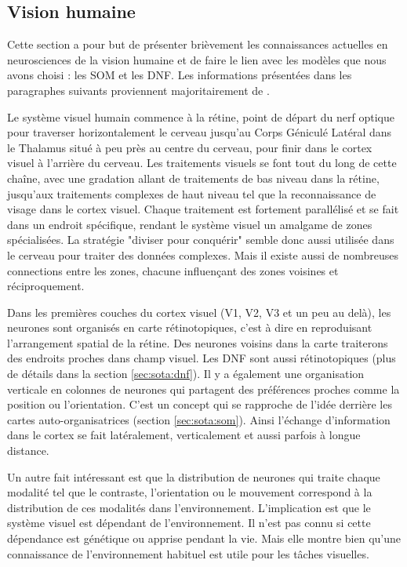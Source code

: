 \subsection{Vision humaine}\label{sec:sota:human_vis}

	Cette section a pour but de présenter brièvement les connaissances actuelles en neurosciences de la vision humaine et de faire le lien avec les modèles que nous avons choisi : les SOM et les DNF. Les informations présentées dans les paragraphes suivants proviennent majoritairement de \cite{gilbert2020constructive}.

	Le système visuel humain commence à la rétine, point de départ du nerf optique pour traverser horizontalement le cerveau jusqu'au Corps Géniculé Latéral dans le Thalamus situé à peu près au centre du cerveau, pour finir dans le cortex visuel à l'arrière du cerveau. Les traitements visuels se font tout du long de cette chaîne, avec une gradation allant de traitements de bas niveau dans la rétine, jusqu'aux traitements complexes de haut niveau tel que la reconnaissance de visage dans le cortex visuel. Chaque traitement est fortement parallélisé et se fait dans un endroit spécifique, rendant le système visuel un amalgame de zones spécialisées. La stratégie "diviser pour conquérir" semble donc aussi utilisée dans le cerveau pour traiter des données complexes. Mais il existe aussi de nombreuses connections entre les zones, chacune influençant des zones voisines et réciproquement.

	Dans les premières couches du cortex visuel (V1, V2, V3 et un peu au delà), les neurones sont organisés en carte rétinotopiques, c'est à dire en reproduisant l'arrangement spatial de la rétine. Des neurones voisins dans la carte traiterons des endroits proches dans champ visuel. Les DNF sont aussi rétinotopiques (plus de détails dans la section \ref{sec:sota:dnf}). Il y a également une organisation verticale en colonnes de neurones qui partagent des préférences proches comme la position ou l'orientation. C'est un concept qui se rapproche de l'idée derrière les cartes auto-organisatrices (section \ref{sec:sota:som}). Ainsi l'échange d'information dans le cortex se fait latéralement, verticalement et aussi parfois à longue distance.

	Un autre fait intéressant est que la distribution de neurones qui traite chaque modalité tel que le contraste, l'orientation ou le mouvement correspond à la distribution de ces modalités dans l'environnement. L'implication est que le système visuel est dépendant de l'environnement. Il n'est pas connu si cette dépendance est génétique ou apprise pendant la vie. Mais elle montre bien qu'une connaissance de l'environnement habituel est utile pour les tâches visuelles.

